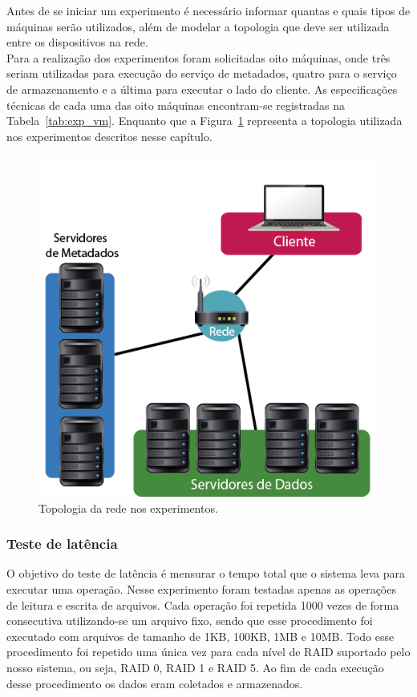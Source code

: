 	Antes de se iniciar um experimento é necessário informar quantas e quais tipos de máquinas serão utilizados, além de modelar a topologia que deve ser utilizada entre os dispositivos na rede. 
	\\
	
	Para a realização dos experimentos foram solicitadas oito máquinas, onde três seriam utilizadas para execução do serviço de metadados, quatro para o serviço de armazenamento e a última para executar o lado do cliente. As especificações técnicas de cada uma das oito máquinas encontram-se registradas na Tabela~\ref{tab:exp_vm}. Enquanto que a Figura~\ref{fig:emulab} representa a topologia utilizada nos experimentos descritos nesse capítulo.
	\\
	
	\begin{figure}[htb]
		\begin{center}
			\includegraphics[clip,scale=0.5]{images/emulab.png}
			\caption{Topologia da rede nos experimentos.}
			\label{fig:emulab}
		\end{center}
	\end{figure} 
	

	\subsubsection{Teste de latência}
	O objetivo do teste de latência é mensurar o tempo total que o sistema leva para executar uma operação. Nesse experimento foram testadas apenas as operações de leitura e escrita de arquivos. Cada operação foi repetida 1000 vezes de forma consecutiva utilizando-se um arquivo fixo, sendo que esse procedimento foi executado com arquivos de tamanho de 1KB, 100KB, 1MB e 10MB. Todo esse procedimento foi repetido uma única vez para cada nível de RAID suportado pelo nosso sistema, ou seja, RAID 0, RAID 1 e RAID 5. Ao fim de cada execução desse procedimento os dados eram coletados e armazenados.
	\\
	
